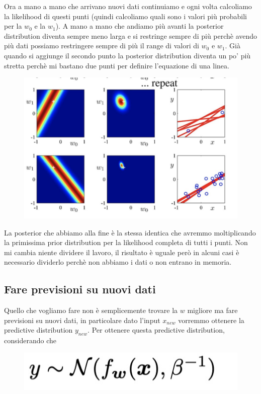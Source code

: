 \documentclass[14pt]{extreport}
\begin{document}
Ora a mano a mano che arrivano nuovi dati continuiamo e ogni volta calcoliamo la likelihood di questi punti (quindi calcoliamo quali sono i valori più
probabili per la $w_0$ e la $w_1$). A mano a mano che andiamo più avanti la posterior distribution diventa sempre meno larga e si restringe sempre di
più perchè avendo più dati possiamo restringere sempre di più il range di valori di $w_0$ e $w_1$. Già quando si aggiunge il secondo punto la
posterior distribution diventa un po' più stretta perchè mi bastano due punti per definire l'equazione di una linea.

\begin{figure}[H]
	\centering
	\includegraphics[width=0.7\linewidth]{134.jpeg}
\end{figure}

La posterior che abbiamo alla fine è la stessa identica che avremmo moltiplicando la primissima prior distribution per la likelihood completa di tutti
i punti. Non mi cambia niente dividere il lavoro, il risultato è uguale però in alcuni casi è necessario dividerlo perchè non abbiamo i dati o non
entrano in memoria.

\subsection{Fare previsioni su nuovi dati}

Quello che vogliamo fare non è semplicemente trovare la $w$ migliore ma fare previsioni su nuovi dati, in particolare dato l'input $x_{new}$ vorremmo
ottenere la predictive distribution $y_{new}$. Per ottenere questa predictive distribution, considerando che
\begin{figure}[H]
	\centering
	\includegraphics[width=0.4\linewidth]{135.jpeg}
\end{figure}
\end{document}

